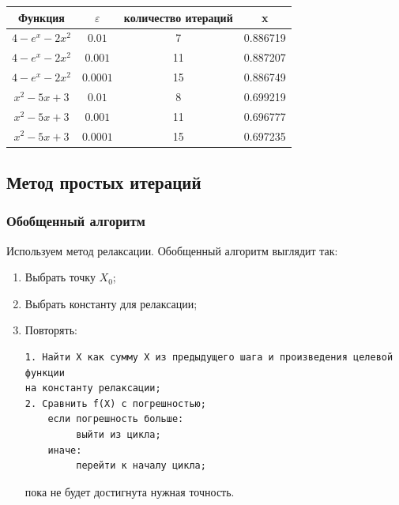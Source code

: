 \documentclass{article}
\begin{document}
				\begin{tabular}{|c|c|c|c|}
				\hline
				
				Функция & $\varepsilon$ & количество итераций & x\\
								
				\hline
				$4- e^x - 2x^2$ & $0.01$ & 7 & 0.886719\\
				
				\hline
				$4- e^x - 2x^2$ & $0.001$ & 11 & 0.887207\\
				\hline
				$4- e^x - 2x^2$ & $0.0001$ & 15 & 0.886749\\
				\hline
				
				
				
				$x^2 - 5x + 3$ & $0.01$ & 8 & 0.699219\\
				
				\hline
				$x^2 - 5x + 3$ & $0.001$ & 11 & 0.696777\\
				\hline
				$x^2 - 5x + 3$ & $0.0001$ & 15 & 0.697235\\
				\hline
				
				
				\end{tabular}
				
			\subsection{Метод простых итераций}
			
				\subsubsection{Обобщенный алгоритм}
				
				Используем метод релаксации. Обобщенный алгоритм выглядит так:
				
				\begin{enumerate}
					\item 
					
					Выбрать точку $X_0$;
					
					\item Выбрать константу для релаксации; 
					
					\item 
					
					Повторять:
					
					\begin{verbatim}
1. Найти X как сумму X из предыдущего шага и произведения целевой функции 
на константу релаксации;
2. Сравнить f(X) с погрешностью;
    если погрешность больше:
         выйти из цикла;
    иначе: 
         перейти к началу цикла;
					\end{verbatim}
					пока не будет достигнута нужная точность.
				\end{enumerate}
				
\end{document}

